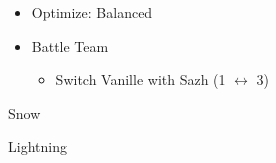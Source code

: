 \begin{multicols}{2}
\begin{menu}
\begin{itemize}
\begin{multicols}{2}
\begin{itemize}
\begin{itemize}
            \item Optimize: Balanced
        \end{itemize}
    \end{itemize}
\end{multicols}
    \paradigm
    \begin{itemize}
        \item Battle Team
        \begin{itemize}
            \item Switch Vanille with Sazh (1 $\leftrightarrow$ 3)
        \end{itemize}
        \end{itemize}
        \begin{center}Snow\end{center}
        
{\paradigmline{\com}{\com}{\med}}%
{\paradigmline[2]{\textit{\com}}{\textit{\com}}{\textit{(\rav)}}}%
{\paradigmline{(\sen)}{\sen}{(\med)}}%
{\paradigmline{\syn}{\rav}{\rav}}%
{\paradigmline{\rav}{\rav}{\sab}}%
{\paradigmline{\rav}{\rav}{\rav}}


	\begin{center}Lightning\end{center}
	
{\paradigmline{\syn}{\rav}{\rav}}%
{\paradigmline{\rav}{\rav}{\rav}}	%
{\paradigmline{(\sen)}{\sen}{(\med)}}%
{\paradigmline[4]{\textit{\com}}{\textit{\com}}{\textit{(\rav)}}}%
{\paradigmline{\com}{\com}{\med}}%
{\paradigmline{\rav}{\rav}{\sab}}
\end{itemize}


\end{menu}
\end{multicols}
